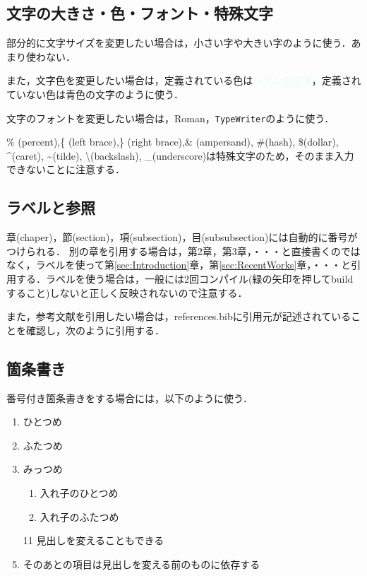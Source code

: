 \subsection{文字の大きさ・色・フォント・特殊文字}\label{sec:文字}
部分的に文字サイズを変更したい場合は，{\tiny 小さい字}や{\large 大きい字}のように使う．あまり使わない．

また，文字色を変更したい場合は，定義されている色は\textcolor{lightcyan}{シアンの文字}，定義されていない色は\textcolor[rgb]{0.0,0.0,1.0}{青色の文字}のように使う．

文字のフォントを変更したい場合は，\textrm{Roman}，\texttt{TypeWriter}のように使う．

\% (percent),\{ (left brace),\} (right brace),\& (ampersand), \#(hash), \$(dollar), \textasciicircum(caret), \textasciitilde(tilde), \textbackslash(backslash), \_(underscore)は特殊文字のため，そのまま入力できないことに注意する．

\subsection{ラベルと参照}\label{sec:ラベル}
章(chaper)，節(section)，項(subsection)，目(subsubsection)には自動的に番号がつけられる．
別の章を引用する場合は，第2章，第3章，・・・と直接書くのではなく，ラベルを使って第\ref{sec:Introduction}章，第\ref{sec:RecentWorks}章，・・・と引用する．ラベルを使う場合は，一般には2回コンパイル(緑の矢印を押してbuildすること)しないと正しく反映されないので注意する．

また，参考文献を引用したい場合は，references.bibに引用元が記述されていることを確認し，次\cite{ref:mnih2013playing}のように引用する．

\subsection{箇条書き}\label{sec:箇条書き}
番号付き箇条書きをする場合には，以下のように使う．
\begin{enumerate}
    \item ひとつめ
    \item ふたつめ
    \item みっつめ
    \begin{enumerate}
        \item 入れ子のひとつめ
        \item 入れ子のふたつめ
    \end{enumerate}
    \item[11] 見出しを変えることもできる 
    \item そのあとの項目は見出しを変える前のものに依存する
\end{enumerate}

